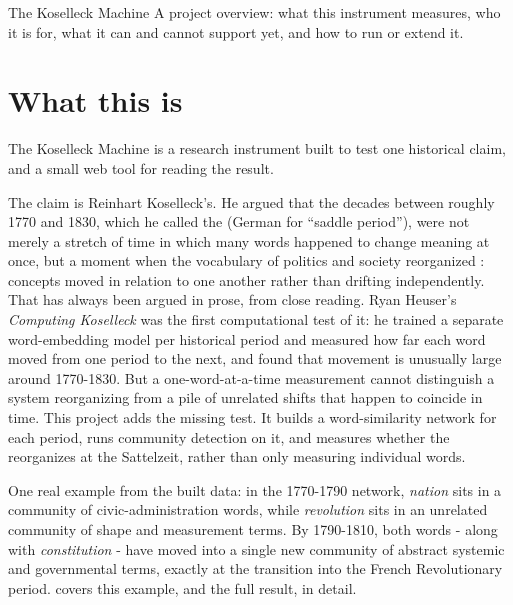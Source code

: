 \documentclass[11pt]{article}
\begin{document}
\specimencover
  {The Koselleck Machine}
  {A project overview: what this instrument measures, who it is for, what
   it can and cannot support yet, and how to run or extend it.}
  {%
  }

\tableofcontents

\newpage

\section{What this is}

The Koselleck Machine is a research instrument built to test one
historical claim, and a small web tool for reading the result.

The claim is Reinhart Koselleck's. He argued that the decades between
roughly 1770 and 1830, which he called the  (German for
``saddle period''), were not merely a stretch of time in which many words
happened to change meaning at once, but a moment when the vocabulary of
politics and society reorganized : concepts moved in
relation to one another rather than drifting independently. That has
always been argued in prose, from close reading. Ryan Heuser's
\emph{Computing Koselleck} was the first computational test of it: he
trained a separate word-embedding model per historical period and
measured how far each word moved from one period to the next, and found
that movement is unusually large around 1770-1830. But a
one-word-at-a-time measurement cannot distinguish a system reorganizing
from a pile of unrelated shifts that happen to coincide in time. This
project adds the missing test. It builds a word-similarity network for
each period, runs community detection on it, and measures whether the
 reorganizes at the Sattelzeit, rather
than only measuring individual words.

One real example from the built data: in the 1770-1790 network,
\emph{nation} sits in a community of civic-administration words, while
\emph{revolution} sits in an unrelated community of shape and
measurement terms. By 1790-1810, both words - along with
\emph{constitution} - have moved into a single new community of
abstract systemic and governmental terms, exactly at the transition
into the French Revolutionary period.  covers
this example, and the full result, in detail.
\end{document}
